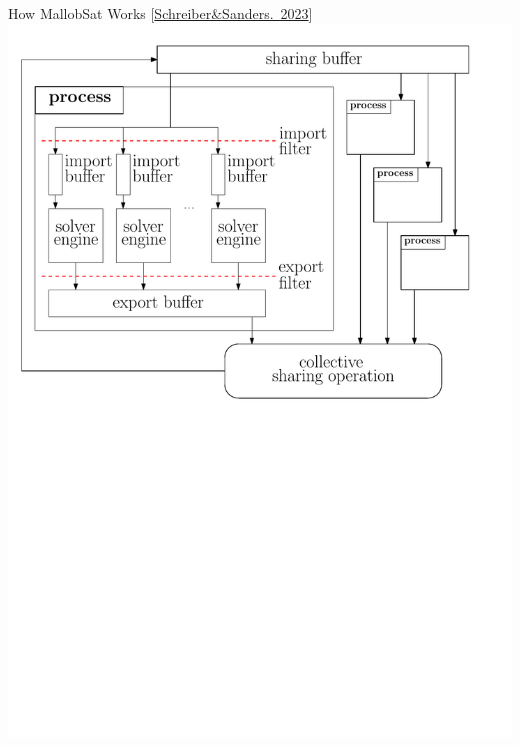 \documentclass{beamer}
\begin{document}
\begin{frame}{How MallobSat Works [\href{https://www.jair.org/index.php/jair/article/download/15827/27072}{Schreiber\&Sanders.~2023}]}
    \center
    \includegraphics[scale=.45]{figures/mallob_architecture.pdf}
\end{frame}
\end{document}
